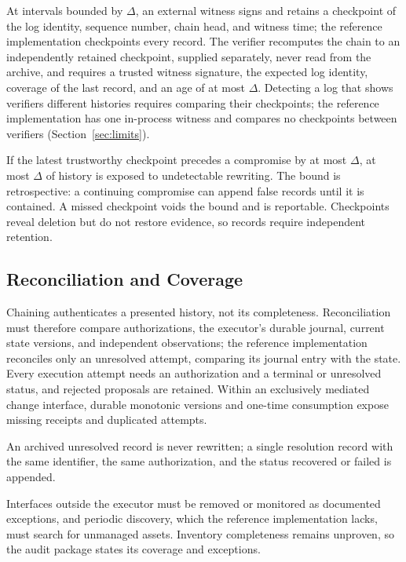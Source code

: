 At intervals bounded by $\Delta$, an external witness signs and retains a checkpoint of the log identity, sequence number, chain head, and witness time; the reference implementation checkpoints every record. The verifier recomputes the chain to an independently retained checkpoint, supplied separately, never read from the archive, and requires a trusted witness signature, the expected log identity, coverage of the last record, and an age of at most $\Delta$. Detecting a log that shows verifiers different histories requires comparing their checkpoints; the reference implementation has one in-process witness and compares no checkpoints between verifiers (Section~\ref{sec:limits}).

If the latest trustworthy checkpoint precedes a compromise by at most $\Delta$, at most $\Delta$ of history is exposed to undetectable rewriting. The bound is retrospective: a continuing compromise can append false records until it is contained. A missed checkpoint voids the bound and is reportable. Checkpoints reveal deletion but do not restore evidence, so records require independent retention.

\subsection{Reconciliation and Coverage}
Chaining authenticates a presented history, not its completeness. Reconciliation must therefore compare authorizations, the executor's durable journal, current state versions, and independent observations; the reference implementation reconciles only an unresolved attempt, comparing its journal entry with the state. Every execution attempt needs an authorization and a terminal or unresolved status, and rejected proposals are retained. Within an exclusively mediated change interface, durable monotonic versions and one-time consumption expose missing receipts and duplicated attempts.

An archived unresolved record is never rewritten; a single resolution record with the same identifier, the same authorization, and the status recovered or failed is appended.

Interfaces outside the executor must be removed or monitored as documented exceptions, and periodic discovery, which the reference implementation lacks, must search for unmanaged assets. Inventory completeness remains unproven, so the audit package states its coverage and exceptions.

